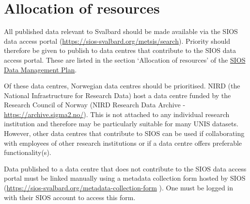 \documentclass[a4paper,english, 11pt]{article}
\begin{document}
\section{Allocation of resources}
\label{s:resources}

All published data relevant to Svalbard should be made available via the SIOS data access portal (\url{https://sios-svalbard.org/metsis/search}). Priority should therefore be given to publish to data centres that contribute to the SIOS data access portal. These are listed in the section `Allocation of resources' of the \href{https://sios-svalbard.org/sites/sios-svalbard.org/files/common/Documents/SIOS_Data_Management_Plan.pdf}{SIOS Data Management Plan}.

Of these data centres, Norwegian data centres should be prioritised. NIRD (the National Infrastructure for Research Data) host a data centre funded by the Research Council of Norway (NIRD Research Data Archive - \url{https://archive.sigma2.no/}). This is not attached to any individual research institution and therefore may be particularly suitable for many UNIS datasets. However, other data centres that contribute to SIOS can be used if collaborating with employees of other research institutions or if a data centre offers preferable functionality(s).


Data published to a data centre that does not contribute to the SIOS data access portal must be linked manually using a metadata collection form hosted by SIOS (\url{https://sios-svalbard.org/metadata-collection-form} ). One must be logged in with their SIOS account to access this form.

\end{document}
